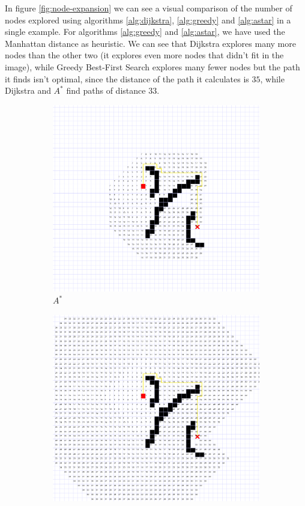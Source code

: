 \documentclass[12pt]{report}
\begin{document}
In figure \ref{fig:node-expansion} we can see a visual comparison of the number of nodes explored using algorithms \ref{alg:dijkstra}, \ref{alg:greedy} and \ref{alg:astar} in a single example. For algorithms \ref{alg:greedy} and \ref{alg:astar}, we have used the Manhattan distance as heuristic. We can see that Dijkstra explores many more nodes than the other two (it explores even more nodes that didn't fit in the image), while Greedy Best-First Search explores many fewer nodes but the path it finds isn't optimal, since the distance of the path it calculates is $35$, while Dijkstra and $A^*$ find paths of distance $33$.

\begin{figure}
\centering
\begin{subfigure}[b]{0.45\textwidth}
	\includegraphics[width=1\linewidth]{astar-nodes}
	\caption{$A^*$}
\end{subfigure}
\begin{subfigure}[b]{0.45\textwidth}
	\includegraphics[width=1\linewidth]{dijkstra-nodes}

\end{subfigure}
\end{figure}
\end{document}
